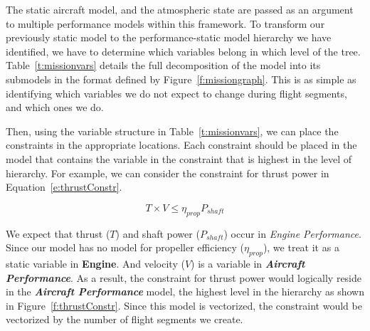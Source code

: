 The static aircraft model, and the atmospheric state are passed as an argument to multiple
performance models within this framework. To transform our previously static model to
the performance-static model hierarchy we have identified,
we have to determine which variables
belong in which level of the tree. Table~\ref{t:missionvars} details the full
decomposition of the model into its submodels in the format defined
by Figure~\ref{f:missiongraph}. This is as simple as identifying which variables
we do not expect to change during flight segments, and which ones we do.

\begin{center}
    
    \label{t:missionvars}
\end{center}

Then, using the variable structure in Table~\ref{t:missionvars}, we can place the
constraints in the appropriate locations. Each constraint should be placed
in the model that contains the variable in the constraint that is highest in the level of hierarchy. For example,
we can consider the constraint for thrust power in Equation~\ref{e:thrustConstr}.

\begin{equation}
    \label{e:thrustConstr}
    T \times V \leq \eta_{prop} P_{shaft}
\end{equation}

We expect that thrust ($T$) and shaft power ($P_{shaft}$) occur
in \textit{Engine Performance}. Since our model has no model for propeller efficiency ($\eta_{prop}$), we treat it
as a static variable in \textbf{Engine}. And velocity ($V$) is a variable in \textbf{\textit{Aircraft {Performance}}}.
As a result, the constraint for thrust power would logically reside in the \textbf{\textit{Aircraft {Performance}}}
model, the highest level in the hierarchy as shown in Figure~\ref{f:thrustConstr}. Since this model is vectorized,
the constraint would be vectorized by the number of flight segments we create.

